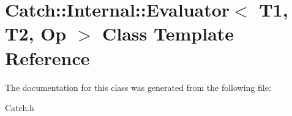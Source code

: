 \hypertarget{class_catch_1_1_internal_1_1_evaluator}{\section{Catch\-:\-:Internal\-:\-:Evaluator$<$ T1, T2, Op $>$ Class Template Reference}
\label{class_catch_1_1_internal_1_1_evaluator}
}


The documentation for this class was generated from the following file\-:\begin{DoxyCompactItemize}
\item 
Catch.\-h\end{DoxyCompactItemize}
